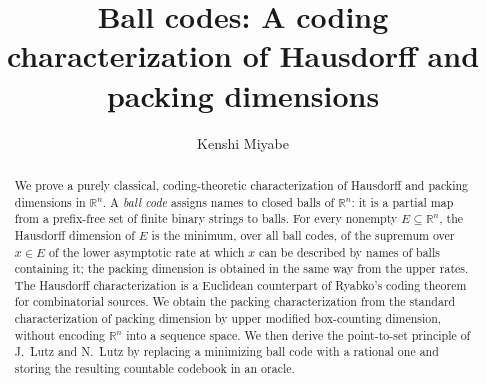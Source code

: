 \documentclass[a4paper,oneside,reqno,12pt]{amsart}
\theoremstyle{plain}
\theoremstyle{definition}
\theoremstyle{remark}
\begin{document}
\title[Ball Codes and Dimensions]{Ball codes: A coding characterization of Hausdorff and packing dimensions}

\author{Kenshi Miyabe}

\address[K.~Miyabe]{Meiji University, Japan}

\date{}



\begin{abstract}
We prove a purely classical, coding-theoretic characterization of Hausdorff and
packing dimensions in \(\mathbb R^n\).  A \emph{ball code} assigns names to closed
balls of \(\mathbb R^n\): it is a partial map from a prefix-free set of finite
binary strings to balls.
For every nonempty
\(E\subseteq\mathbb R^n\), the Hausdorff dimension of \(E\) is the minimum, over
all ball codes, of the supremum over \(x\in E\) of the lower asymptotic rate at
which \(x\) can be described by names of balls containing it; the packing
dimension is obtained in the same way from the upper rates.
The Hausdorff characterization
is a Euclidean counterpart of Ryabko's coding theorem for
combinatorial sources.
We obtain the packing characterization from the standard characterization of
packing dimension by upper modified box-counting dimension, without encoding
\(\mathbb R^n\) into a sequence space.
We then derive the point-to-set principle of J.~Lutz and N.~Lutz by
replacing a minimizing ball code with a rational one and storing the resulting
countable codebook in an oracle.
\end{abstract}

\end{document}
